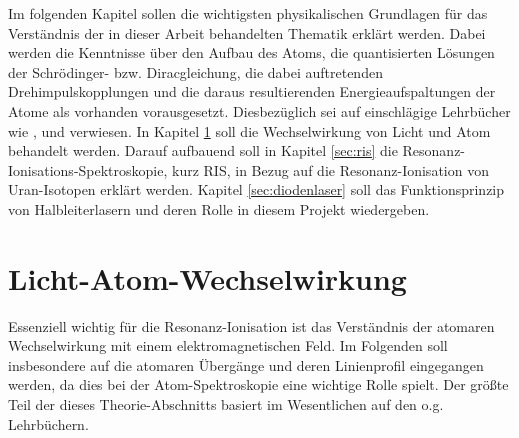 Im folgenden Kapitel sollen die wichtigsten physikalischen Grundlagen für das
Verständnis der in dieser Arbeit behandelten Thematik erklärt werden. Dabei
werden die Kenntnisse über den Aufbau des Atoms, die quantisierten Lösungen der
Schrödinger- bzw. Diracgleichung, die dabei auftretenden Drehimpulskopplungen
und die daraus resultierenden Energieaufspaltungen der Atome als vorhanden
vorausgesetzt. Diesbezüglich sei auf einschlägige Lehrbücher wie
\cite{demtroeder:ex3}, \cite{demtroeder:laserspektroskopie} und \cite{saleh:grundlagen_der_photonik}
verwiesen. In Kapitel \ref{sec:licht-atom-wechselwirkung} soll die
Wechselwirkung von Licht und Atom behandelt werden. Darauf aufbauend soll
in Kapitel \ref{sec:ris} die Resonanz-Ionisations-Spektroskopie,
kurz RIS, in Bezug auf die Resonanz-Ionisation von Uran-Isotopen erklärt
werden. Kapitel \ref{sec:diodenlaser} soll das Funktionsprinzip von
Halbleiterlasern und deren Rolle in diesem Projekt wiedergeben.

\section{Licht-Atom-Wechselwirkung}\label{sec:licht-atom-wechselwirkung}
Essenziell wichtig für die Resonanz-Ionisation ist das Verständnis der atomaren
Wechselwirkung mit einem elektromagnetischen Feld. Im Folgenden soll insbesondere auf die
atomaren Übergänge und deren Linienprofil eingegangen werden, da dies bei der
Atom-Spektroskopie eine wichtige Rolle spielt. Der größte Teil der dieses
Theorie-Abschnitts basiert im Wesentlichen auf den o.g. Lehrbüchern.



